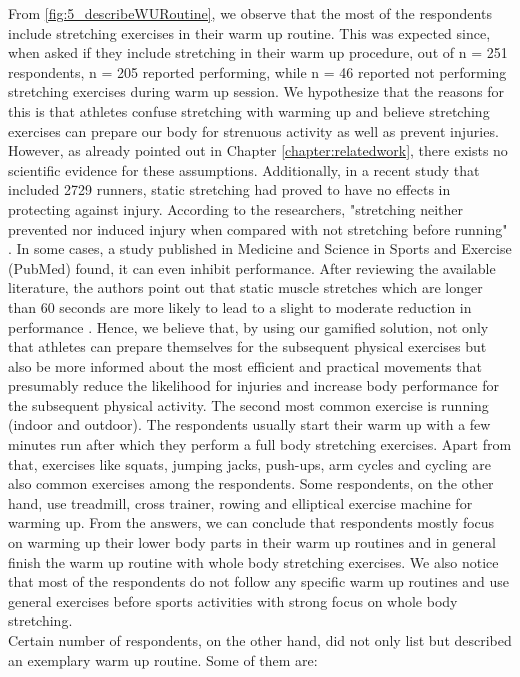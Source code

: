 From \ref{fig:5_describeWURoutine}, we observe that the most of the respondents include stretching exercises in their warm up routine. This was expected since, when asked if they include stretching in their warm up procedure, out of n = 251 respondents, n = 205 reported performing, while n = 46 reported not performing stretching exercises during warm up session. We hypothesize that the reasons for this is that athletes confuse stretching with warming up and believe stretching exercises can prepare our body for strenuous activity as well as prevent injuries. However, as already pointed out in Chapter \ref{chapter:relatedwork}, there exists no scientific evidence for these assumptions. Additionally, in a recent study that included 2729 runners, static stretching had proved to have no effects in protecting against injury. According to the researchers, "stretching neither prevented nor induced injury when compared with not stretching before running" \cite{pereles2012large}. In some cases, a study published in Medicine and Science in Sports and Exercise (PubMed) found, it can even inhibit performance. After reviewing the available literature, the authors point out that static muscle stretches which are longer than 60 seconds are more likely to lead to a slight to moderate reduction in performance \cite{kay2012effect}. Hence, we believe that, by using our gamified solution, not only that athletes can prepare themselves for the subsequent physical exercises but also be more informed about the most efficient and practical movements that presumably reduce the likelihood for injuries and increase body performance for the subsequent physical activity. The second most common exercise is running (indoor and outdoor). The respondents usually start their warm up with a few minutes run after which they perform a full body stretching exercises. Apart from that, exercises like squats, jumping jacks, push-ups, arm cycles and cycling are also common exercises among the respondents. Some respondents, on the other hand, use treadmill, cross trainer, rowing and elliptical exercise machine for warming up. From the answers, we can conclude that respondents mostly focus on warming up their lower body parts in their warm up routines and in general finish the warm up routine with whole body stretching exercises. We also notice that most of the respondents do not follow any specific warm up routines and use general exercises before sports activities with strong focus on whole body stretching.\\Certain number of respondents, on the other hand, did not only list but described an exemplary warm up routine. Some of them are: 
